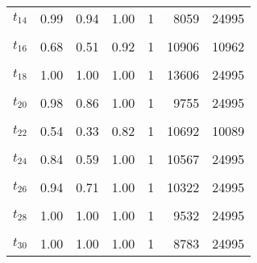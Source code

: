 \begin{table}
\begin{tabular}[t]{lrrrrrr}
$t_{14}$ & 0.99 & 0.94 & 1.00 & 1 & 8059 & 24995\\
\cellcolor{gray!6}{$t_{15}$} & \cellcolor{gray!6}{1.00} & \cellcolor{gray!6}{1.00} & \cellcolor{gray!6}{1.00} & \cellcolor{gray!6}{1} & \cellcolor{gray!6}{13664} & \cellcolor{gray!6}{24995}\\
$t_{16}$ & 0.68 & 0.51 & 0.92 & 1 & 10906 & 10962\\
\cellcolor{gray!6}{$t_{17}$} & \cellcolor{gray!6}{0.74} & \cellcolor{gray!6}{0.56} & \cellcolor{gray!6}{0.98} & \cellcolor{gray!6}{1} & \cellcolor{gray!6}{10625} & \cellcolor{gray!6}{10019}\\
$t_{18}$ & 1.00 & 1.00 & 1.00 & 1 & 13606 & 24995\\
\cellcolor{gray!6}{$t_{19}$} & \cellcolor{gray!6}{1.00} & \cellcolor{gray!6}{1.00} & \cellcolor{gray!6}{1.00} & \cellcolor{gray!6}{1} & \cellcolor{gray!6}{8822} & \cellcolor{gray!6}{24995}\\
$t_{20}$ & 0.98 & 0.86 & 1.00 & 1 & 9755 & 24995\\
\cellcolor{gray!6}{$t_{21}$} & \cellcolor{gray!6}{0.85} & \cellcolor{gray!6}{0.57} & \cellcolor{gray!6}{1.00} & \cellcolor{gray!6}{1} & \cellcolor{gray!6}{10456} & \cellcolor{gray!6}{24995}\\
$t_{22}$ & 0.54 & 0.33 & 0.82 & 1 & 10692 & 10089\\
\cellcolor{gray!6}{$t_{23}$} & \cellcolor{gray!6}{0.94} & \cellcolor{gray!6}{0.76} & \cellcolor{gray!6}{1.00} & \cellcolor{gray!6}{1} & \cellcolor{gray!6}{9860} & \cellcolor{gray!6}{24995}\\
$t_{24}$ & 0.84 & 0.59 & 1.00 & 1 & 10567 & 24995\\
\cellcolor{gray!6}{$t_{25}$} & \cellcolor{gray!6}{0.85} & \cellcolor{gray!6}{0.59} & \cellcolor{gray!6}{1.00} & \cellcolor{gray!6}{1} & \cellcolor{gray!6}{10017} & \cellcolor{gray!6}{24995}\\
$t_{26}$ & 0.94 & 0.71 & 1.00 & 1 & 10322 & 24995\\
\cellcolor{gray!6}{$t_{27}$} & \cellcolor{gray!6}{0.84} & \cellcolor{gray!6}{0.47} & \cellcolor{gray!6}{1.00} & \cellcolor{gray!6}{1} & \cellcolor{gray!6}{9678} & \cellcolor{gray!6}{24995}\\
$t_{28}$ & 1.00 & 1.00 & 1.00 & 1 & 9532 & 24995\\
\cellcolor{gray!6}{$t_{29}$} & \cellcolor{gray!6}{1.00} & \cellcolor{gray!6}{1.00} & \cellcolor{gray!6}{1.00} & \cellcolor{gray!6}{1} & \cellcolor{gray!6}{14513} & \cellcolor{gray!6}{24995}\\
$t_{30}$ & 1.00 & 1.00 & 1.00 & 1 & 8783 & 24995\\

\end{tabular}
\end{table}
